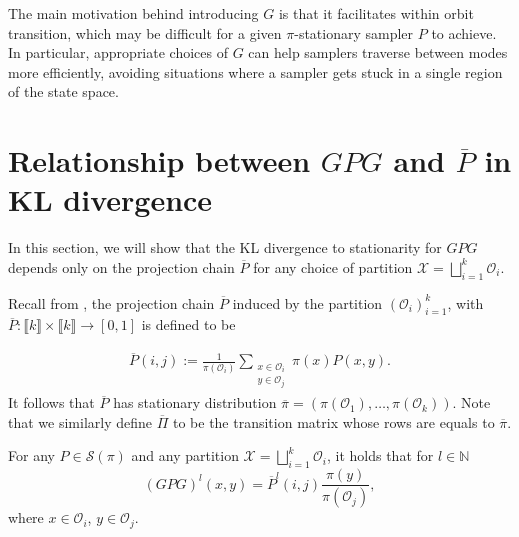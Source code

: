 \documentclass[EJP]{ejpecp} %
\begin{document}
The main motivation behind introducing $G$ is that it facilitates within orbit transition, which may be difficult for a given $\pi$-stationary sampler $P$ to achieve. In particular, appropriate choices of $G$ can help samplers traverse between modes more efficiently, avoiding situations where a sampler gets stuck in a single region of the state space.

\section{Relationship between $GPG$ and $\overline{P}$ in KL divergence} \label{sec:KL}

In this section, we will show that the KL divergence to stationarity for $GPG$ depends only on the projection chain $\overline{P}$ for any choice of partition $\mathcal{X} = \bigsqcup_{i=1}^k \mathcal{O}_i.$

Recall from \cite{Jerrum_2004}, the projection chain $\overline{P}$ induced by the partition $(\mathcal{O}_i)_{i=1}^k$, with $\overline{P}: \llbracket k \rrbracket \times \llbracket k \rrbracket \to [0,1]$ is defined to be

\begin{align} \label{eq:Pbar}
    \overline{P}(i,j) := \frac{1}{\pi(\mathcal{O}_i)} \sum_{\substack{x \in \mathcal{O}_i \\ y \in \mathcal{O}_j}} \pi(x) P(x,y).
\end{align}
It follows that $\overline{P}$ has stationary distribution $\overline{\pi} = (\pi(\mathcal{O}_1), \dots, \pi(\mathcal{O}_k)).$ Note that we similarly define $\overline{\Pi}$ to be the transition matrix whose rows are equals to $\overline{\pi}$.

\begin{proposition}\label{prop:GPGoverlinePrs}
    For any $P \in \mathcal{S}(\pi)$ and any partition $\mathcal{X} = \bigsqcup_{i=1}^k \mathcal{O}_i$, it holds that for $l \in \mathbb{N}$
    \begin{equation*}
        (GPG)^l (x,y) = \overline{P}^l (i,j) \frac{\pi(y)}{\pi(\mathcal{O}_j)},
    \end{equation*}
    where $x \in \mathcal{O}_i$, $y \in \mathcal{O}_j.$
\end{proposition}
\end{document}
